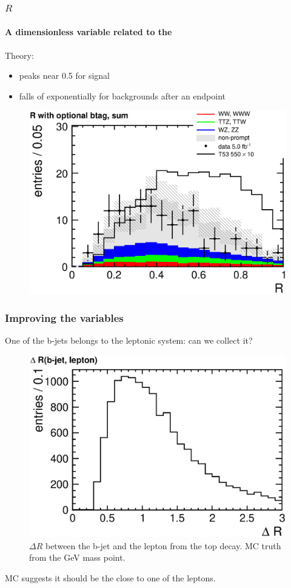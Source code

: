 \documentclass[ukenglish]{beamer}
\begin{document}
\begin{frame}
    \frametitle{$R$}
    \framesubtitle{A dimensionless variable related to the \met}
    Theory:
    \begin{itemize}
        \item peaks near 0.5 for signal
        \item falls of exponentially for backgrounds after an endpoint
    \end{itemize}
        \begin{figure}[h]
            \centering
            \includegraphics[width=.7\textwidth]{r_optional_btag_sum.eps}
        \end{figure}
\end{frame}

\begin{frame}
    \frametitle{Improving the variables}
    One of the b-jets belongs to the leptonic system: can we collect it?
    \begin{figure}[h]
        \centering
        \includegraphics[height=.6\textheight]{signal_mc_dr_jet_lepton.eps}
        \caption{$\Delta R$ between the b-jet and the lepton from the top
            decay. MC truth from the \unit[550]{GeV} mass point.}
    \end{figure}
    MC suggests it should be the close to one of the leptons.
\end{frame}
\end{document}
